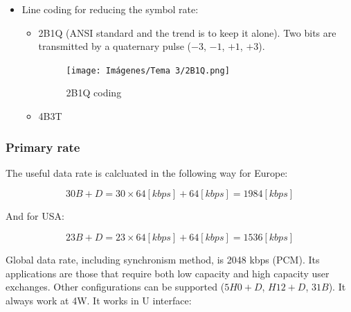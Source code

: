 \documentclass[
	12pt,
	twoside
]{book}
\begin{document}
\begin{itemize}
{\begin{itemize}
{\begin{itemize}
{						$
							\frac {12 \cdot 2 \cdot 8 [b]} {1.5 \cdot 10^{-3} [s]} = 128 \cdot 10^3 [bps]
						$
					}
					\item {
						D channel rate:

						$
							\frac {12 \cdot 2 [b]} {1.5 \cdot 10^{-3} [s]} = 16 \cdot 10^3 [bps]
						$
					}
					\item {
						Total channels rate:

						$
							\frac {12 \cdot 2 \cdot 8 [b] + 12 \cdot 2 [b]} {1.5 \cdot 10^{-3} [s]} = 144 \cdot 10^3 [bps]
						$
					}
					\item {
						Total rate:

						$
							\frac {1 \cdot 18 [b] + 1 \cdot 6 [b] + 12 \cdot 2 \cdot 8 [b] + 12 \cdot 2 [b]} {1.5 \cdot 10^{-3} [s]} = 160 \cdot 10^3 [bps]
						$
					}
				\end{itemize}
			}
			\item {
				Line coding for reducing the symbol rate:
				\begin{itemize}
					\item {
						2B1Q (ANSI standard and the trend is to keep it alone). Two bits are transmitted by a quaternary pulse ($-3$, $-1$, $+1$, $+3$).

						\begin{figure}[H]
							\centering
							\texttt{[image: Imágenes/Tema 3/2B1Q.png]}
							\caption{
								\label{fig:unit3_2B1Q}
								2B1Q coding
							}
						\end{figure}
					}
					\item 4B3T
				\end{itemize}
			}
		\end{itemize}
	}
\end{itemize}

\subsubsection{Primary rate}

The useful data rate is calcluated in the following way for Europe:

$$
	30B + D = 30 \times 64 [kbps] + 64 [kbps] = 1984 [kbps]
$$

And for USA:

$$
	23B + D = 23 \times 64 [kbps] + 64 [kbps] = 1536 [kbps]
$$

Global data rate, including synchronism method, is 2048 kbps (PCM). Its applications are those that require both low capacity and high capacity user exchanges. Other configurations can be supported ($5H0 + D$, $H12 + D$, $31B$). It always work at 4W. It works in U interface:
\end{document}
